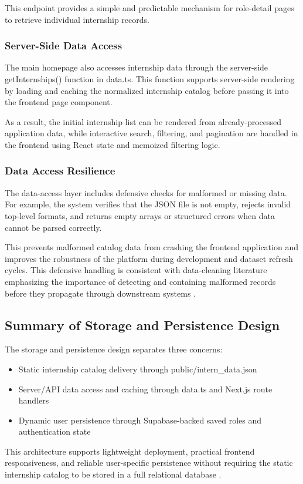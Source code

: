 This endpoint provides a simple and predictable mechanism for role-detail pages to retrieve individual internship records.

\subsubsection*{Server-Side Data Access}

The main homepage also accesses internship data through the server-side getInternships() function in data.ts. This function supports server-side rendering by loading and caching the normalized internship catalog before passing it into the frontend page component.

As a result, the initial internship list can be rendered from already-processed application data, while interactive search, filtering, and pagination are handled in the frontend using React state and memoized filtering logic.

\subsubsection*{Data Access Resilience}

The data-access layer includes defensive checks for malformed or missing data. For example, the system verifies that the JSON file is not empty, rejects invalid top-level formats, and returns empty arrays or structured errors when data cannot be parsed correctly.

This prevents malformed catalog data from crashing the frontend application and improves the robustness of the platform during development and dataset refresh cycles. This defensive handling is consistent with data-cleaning literature emphasizing the importance of detecting and containing malformed records before they propagate through downstream systems \cite{doan2012principles}.

\subsection{Summary of Storage and Persistence Design}

The storage and persistence design separates three concerns:
\begin{itemize}[leftmargin=1.4em,itemsep=0.25em,topsep=0.25em]
\item Static internship catalog delivery through public/intern\_data.json
\item Server/API data access and caching through data.ts and Next.js route handlers
\item Dynamic user persistence through Supabase-backed saved roles and authentication state
\end{itemize}
This architecture supports lightweight deployment, practical frontend responsiveness, and reliable user-specific persistence without requiring the static internship catalog to be stored in a full relational database \cite{kleppmann2017designing, fielding2002principled}.

